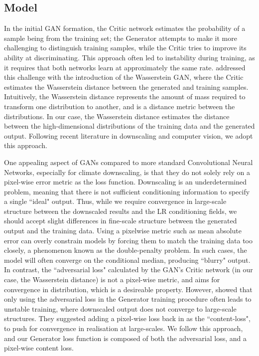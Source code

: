 \documentclass{ametsocV6.1}
\begin{document}
\subsection{Model}
In the initial GAN formation, the Critic network estimates the probability of a sample being from the training set; the Generator attempts to make it more challenging to distinguish training samples, while the Critic tries to improve its ability at discriminating. This approach often led to instability during training, as it requires that both networks learn at approximately the same rate. \citet{arjovsky2017wasserstein} addressed this challenge with the introduction of the Wasserstein GAN, where the Critic estimates the Wasserstein distance between the generated and training samples. Intuitively, the Wasserstein distance represents the amount of mass required to transform one distribution to another, and is a distance metric between the distributions. In our case, the Wasserstein distance estimates the distance between the high-dimensional distributions of the training data and the generated output. Following recent literature in downscaling and computer vision, we adopt this approach. 

One appealing aspect of GANs compared to more standard Convolutional Neural Networks, especially for climate downscaling, is that they do not solely rely on a pixel-wise error metric as the loss function. Downscaling is an underdetermined problem, meaning that there is not sufficient conditioning information to specify a single ``ideal" output. Thus, while we require convergence in large-scale structure between the downscaled results and the LR conditioning fields, we should accept slight differences in fine-scale structure between the generated output and the training data. Using a pixelwise metric such as mean absolute error can overly constrain models by forcing them to match the training data too closely, a phenomenon known as the double-penalty problem. In such cases, the model will often converge on the conditional median, producing ``blurry" output. In contrast, the ``adversarial loss" calculated by the GAN's Critic network (in our case, the Wasserstein distance) is not a pixel-wise metric, and aims for convergence in distribution, which is a desireable property. However, \citet{wang2018esrgan} showed that only using the adversarial loss in the Generator training procedure often leads to unstable training, where downscaled output does not converge to large-scale structures. They suggested adding a pixel-wise loss back in as the ``content-loss", to push for convergence in realisation at large-scales. We follow this approach, and our Generator loss function is composed of both the adversarial loss, and a pixel-wise content loss. 
\end{document}
